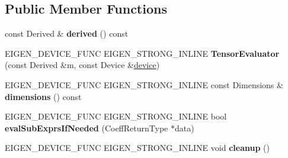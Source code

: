 \subsection*{Public Member Functions}
\begin{DoxyCompactItemize}
\item 
\mbox{\label{struct_eigen_1_1_tensor_evaluator_3_01const_01_derived_00_01_device_01_4_ae6b711ee9568ec097de99fd2903b33f1}} 
const Derived \& {\bfseries derived} () const
\item 
\mbox{\label{struct_eigen_1_1_tensor_evaluator_3_01const_01_derived_00_01_device_01_4_ac45b17691ceec9190e1ab8b38677eec0}} 
E\+I\+G\+E\+N\+\_\+\+D\+E\+V\+I\+C\+E\+\_\+\+F\+U\+NC E\+I\+G\+E\+N\+\_\+\+S\+T\+R\+O\+N\+G\+\_\+\+I\+N\+L\+I\+NE {\bfseries Tensor\+Evaluator} (const Derived \&m, const Device \&\hyperlink{struct_eigen_1_1_tensor_evaluator_3_01const_01_derived_00_01_device_01_4_ac5b59eb35ea904aca2c6e6fa6e719ff4}{device})
\item 
\mbox{\label{struct_eigen_1_1_tensor_evaluator_3_01const_01_derived_00_01_device_01_4_a7da37d1c431539f64140df9cf9903042}} 
E\+I\+G\+E\+N\+\_\+\+D\+E\+V\+I\+C\+E\+\_\+\+F\+U\+NC E\+I\+G\+E\+N\+\_\+\+S\+T\+R\+O\+N\+G\+\_\+\+I\+N\+L\+I\+NE const Dimensions \& {\bfseries dimensions} () const
\item 
\mbox{\label{struct_eigen_1_1_tensor_evaluator_3_01const_01_derived_00_01_device_01_4_a430b1109265b3ef672bd7e583bc74062}} 
E\+I\+G\+E\+N\+\_\+\+D\+E\+V\+I\+C\+E\+\_\+\+F\+U\+NC E\+I\+G\+E\+N\+\_\+\+S\+T\+R\+O\+N\+G\+\_\+\+I\+N\+L\+I\+NE bool {\bfseries eval\+Sub\+Exprs\+If\+Needed} (Coeff\+Return\+Type $\ast$data)
\item 
\mbox{\label{struct_eigen_1_1_tensor_evaluator_3_01const_01_derived_00_01_device_01_4_a5fd6c294c436073f5090b7646c7c19cf}} 
E\+I\+G\+E\+N\+\_\+\+D\+E\+V\+I\+C\+E\+\_\+\+F\+U\+NC E\+I\+G\+E\+N\+\_\+\+S\+T\+R\+O\+N\+G\+\_\+\+I\+N\+L\+I\+NE void {\bfseries cleanup} ()
\item 

\end{DoxyCompactItemize}
